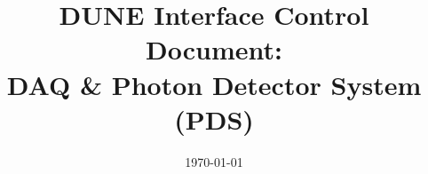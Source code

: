 \documentclass{cernatlasnote}
\title{DUNE Interface Control Document:\\ DAQ \& Photon Detector System (PDS)}
\date{\today}
\begin{document}
\maketitle
\begin{abstract}

\end{abstract}
\vfill
\makereviewtable
\clearpage

\clearpage
\tableofcontents
\clearpage

% 




% 
% 
% 
% 
% 
% 
% 
% 
\end{document}
